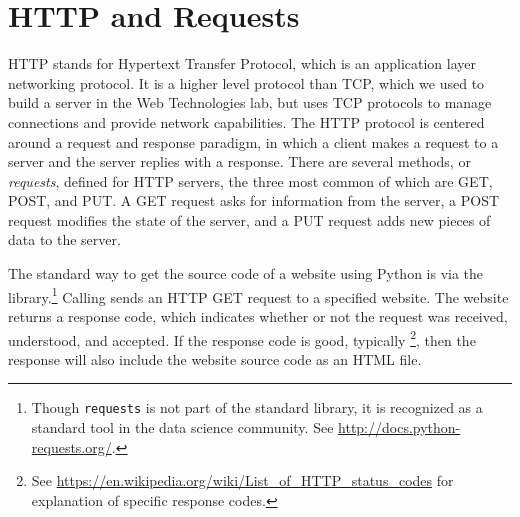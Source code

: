 
\section*{HTTP and Requests} %

HTTP stands for Hypertext Transfer Protocol, which is an application layer networking protocol.
It is a higher level protocol than TCP, which we used to build a server in the Web Technologies lab, but uses TCP protocols to manage connections and provide network capabilities.
The HTTP protocol is centered around a request and response paradigm, in which a client makes a request to a server and the server replies with a response.
There are several methods, or \emph{requests}, defined for HTTP servers, the three most common of which are GET, POST, and PUT.
A GET request asks for information from the server, a POST request modifies the state of the server, and a PUT request adds new pieces of data to the server.

The standard way to get the source code of a website using Python is via the  library.\footnote{Though \texttt{requests} is not part of the standard library, it is recognized as a standard tool in the data science community. See \url{http://docs.python-requests.org/}.}
Calling  sends an HTTP GET request to a specified website.
The website returns a response code, which indicates whether or not the request was received, understood, and accepted.
If the response code is good, typically \footnote{See \url{https://en.wikipedia.org/wiki/List_of_HTTP_status_codes} for explanation of specific response codes.}, then the response will also include the website source code as an HTML file.

